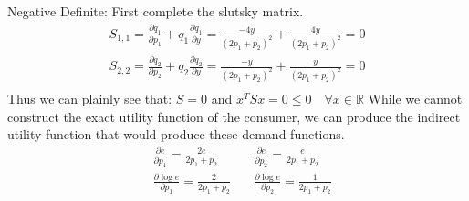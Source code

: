 \documentclass[10pt, letterpaper]{paper}
\begin{document}
Negative Definite: First complete the slutsky matrix.
\begin{eqnarray*}
S_{1,1} = \frac{ \partial q_1}{\partial p_1} + q_1 \frac{ \partial q_1}{\partial y} = \frac{ -4y }{ (2p_1 + p_2)^2 } + \frac{ 4y}{ (2p_1 + p_2)^2 } = 0 \\
S_{2,2} = \frac{ \partial q_2}{\partial p_2} + q_2 \frac{ \partial q_2}{\partial y} = \frac{ -y}{ (2p_1 + p_2)^2 } + \frac{ y }{ (2p_1 + p_2)^2 } = 0\\
\end{eqnarray*}
Thus we can plainly see that: $S = 0$ and $x^T S x = 0 \leq 0 \quad \forall x \in \mathbb{R}$
\newline \newline
While we cannot construct the exact utility function of the consumer, we can produce the indirect utility function that would produce these demand functions.
\begin{equation*}
\begin{alignedat}{6}
&\frac{ \partial e }{\partial p_1} = \frac{ 2e}{2p_1 + p_2 } \quad & \frac{ \partial e }{\partial p_2} = \frac{ e}{ 2p_1 + p_2}\\
&\frac{ \partial \log{e}}{\partial p_1} = \frac{ 2 }{ 2p_1 + p_2} \quad & \frac{ \partial \log{e} }{\partial p_2} = \frac{ 1}{ 2p_1 + p_2}\\
\end{alignedat}
\end{equation*}
\end{document}
